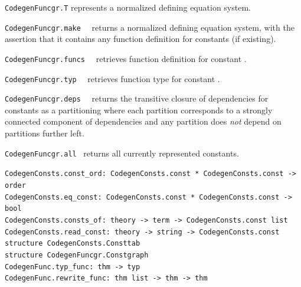 \begin{isabellebody}
\begin{isamarkuptext}
  \begin{description}

  \item \verb|CodegenFuncgr.T| represents
    a normalized defining equation system.

  \item \verb|CodegenFuncgr.make|~~
    returns a normalized defining equation system,
    with the assertion that it contains any function
    definition for constants  (if existing).

  \item \verb|CodegenFuncgr.funcs|~~
    retrieves function definition for constant .

  \item \verb|CodegenFuncgr.typ|~~
    retrieves function type for constant .

  \item \verb|CodegenFuncgr.deps|~~
    returns the transitive closure of dependencies for
    constants  as a partitioning where each partition
    corresponds to a strongly connected component of
    dependencies and any partition does \emph{not}
    depend on partitions further left.

  \item \verb|CodegenFuncgr.all|~
    returns all currently represented constants.

  \end{description}%
\end{isamarkuptext}%
\isamarkuptrue%
%
\endisatagmlref
{\isafoldmlref}%
%
\isadelimmlref
%
\endisadelimmlref
%
\isamarkuptrue%
%
\isadelimmlref
%
\endisadelimmlref
%
\isatagmlref
%
\begin{isamarkuptext}%
\begin{mldecls}
  \verb|CodegenConsts.const_ord: CodegenConsts.const * CodegenConsts.const -> order| \\
  \verb|CodegenConsts.eq_const: CodegenConsts.const * CodegenConsts.const -> bool| \\
  \verb|CodegenConsts.consts_of: theory -> term -> CodegenConsts.const list| \\
  \verb|CodegenConsts.read_const: theory -> string -> CodegenConsts.const| \\
  \verb|structure CodegenConsts.Consttab| \\
  \verb|structure CodegenFuncgr.Constgraph| \\
  \verb|CodegenFunc.typ_func: thm -> typ| \\
  \verb|CodegenFunc.rewrite_func: thm list -> thm -> thm| \\
  \end{mldecls}


\end{isamarkuptext}
\end{isabellebody}
